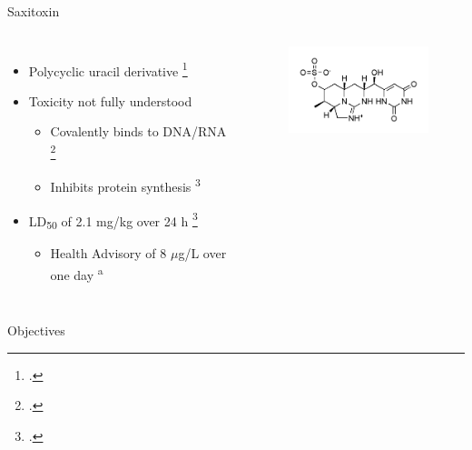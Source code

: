 \begin{frame}{Saxitoxin}
\begin{columns}
	\begin{itemize}
		\item Polycyclic uracil derivative \footcite{moreira_cylindrospermopsin:_2013} 
		\item Toxicity not fully understood 
			\begin{itemize}
				\item Covalently binds to DNA/RNA \footcite{kittler_1._2014} 
				\item Inhibits protein synthesis \textsuperscript{3} 
			\end{itemize}
		\item LD\textsubscript{50} of 2.1 mg/kg over 24 h \footcite{shaw_cylindrospermopsin_2000}
			\begin{itemize}
				\item Health Advisory of 8 $\mu$g/L over one day \textsuperscript{a} 
			\end{itemize}
	\end{itemize}
	\begin{figure}
		\hspace*{-10cm}
		\centering
		\includegraphics[width=2in]{cylindro.png}
	\end{figure}
\end{columns}

\end{frame}
\begin{frame}{Objectives}

\end{frame}
